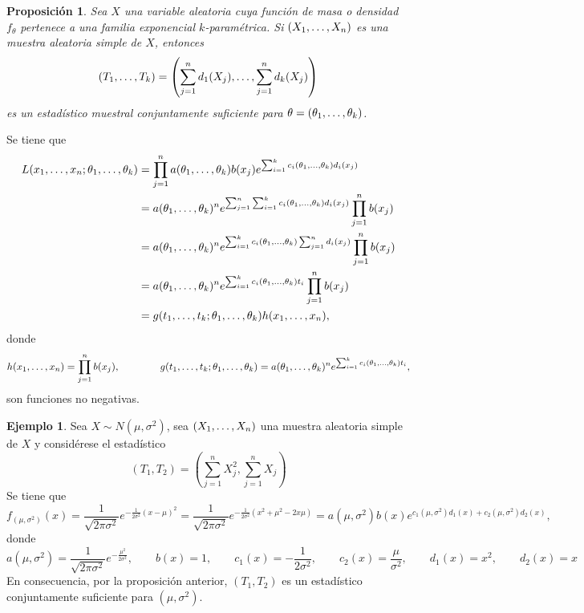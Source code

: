 \documentclass[11pt]{report}
\makeatletter
\renewenvironment{proof}[1][\proofname]{\par
  \pushQED{\qed}%
  \normalfont \topsep\z@skip %
  \trivlist
  \item[\hskip\labelsep
        \itshape
    #1\@addpunct{.}]\ignorespaces
}{%
  \popQED\endtrivlist\@endpefalse
}
\newtheorem{proposition}{Proposición}
\theoremstyle{definition}
\newtheorem{example}{Ejemplo}
\makeatother
\begin{document}
\begin{proposition}
Sea $X$ una variable aleatoria cuya función de masa o densidad $f_\theta$ pertenece a una familia exponencial $k$-paramétrica. Si $(X_1,\mathellipsis,X_n)$ es una muestra aleatoria simple de $X$, entonces
\[(T_1,\mathellipsis,T_k)=\left(\sum_{j=1}^n d_1(X_j),\mathellipsis,\sum_{j=1}^n d_k(X_j)\right)\]
es un estadístico muestral conjuntamente suficiente para $\theta = (\theta_1,\mathellipsis,\theta_k)$.
\end{proposition}

\begin{proof}
Se tiene que
\[
\begin{aligned}[t]
L(x_1,\mathellipsis,x_n;\theta_1,\mathellipsis,\theta_k)
&=\prod_{j=1}^na(\theta_1,\mathellipsis,\theta_k) b(x_j)e^{\sum_{i=1}^kc_i(\theta_1,\mathellipsis,\theta_k)d_i(x_j)} \\
&= a(\theta_1,\mathellipsis,\theta_k)^ne^{\sum_{j=1}^n\sum_{i=1}^kc_i(\theta_1,\mathellipsis,\theta_k)d_i(x_j)}\prod_{j=1}^nb(x_j) \\
&= a(\theta_1,\mathellipsis,\theta_k)^ne^{\sum_{i=1}^kc_i(\theta_1,\mathellipsis,\theta_k)\sum_{j=1}^nd_i(x_j)}\prod_{j=1}^nb(x_j) \\
&= a(\theta_1,\mathellipsis,\theta_k)^ne^{\sum_{i=1}^kc_i(\theta_1,\mathellipsis,\theta_k)t_i}\prod_{j=1}^nb(x_j) \\
&=g(t_1,\mathellipsis,t_k;\theta_1,\mathellipsis,\theta_k)h(x_1,\mathellipsis,x_n),
\end{aligned}
\]
donde \[h(x_1,\mathellipsis,x_n) = \prod_{j=1}^n b(x_j),\qquad\qquad g(t_1,\mathellipsis,t_k;\theta_1,\mathellipsis,\theta_k)= a(\theta_1,\mathellipsis,\theta_k)^ne^{\sum_{i=1}^kc_i(\theta_1,\mathellipsis,\theta_k)t_i},\]
son funciones no negativas.
\end{proof}

\begin{example}
Sea $X \sim N(\mu,\sigma^2)$, sea $(X_1,\mathellipsis,X_n)$ una muestra aleatoria simple de $X$ y considérese el estadístico
\[(T_1,T_2)=\left(\sum_{j=1}^nX_j^2,\sum_{j=1}^n X_j\right)\]
Se tiene que
\[f_{(\mu,\sigma^2)}(x) = \frac{1}{\sqrt{2\pi\sigma^2}}e^{-\frac{1}{2\sigma^2}(x-\mu)^2} = \frac{1}{\sqrt{2\pi\sigma^2}}e^{-\frac{1}{2\sigma^2}(x^2+\mu^2-2x\mu)} = a(\mu,\sigma^2)b(x)e^{c_1(\mu,\sigma^2)d_1(x)+c_2(\mu,\sigma^2)d_2(x)},\]
donde
\[a(\mu,\sigma^2) =\frac{1}{\sqrt{2\pi\sigma^2}}e^{-\frac{\mu^2}{2\sigma^2}}, \qquad b(x) = 1, \qquad c_1(x)=-\frac{1}{2\sigma^2}, \qquad c_2(x)=\frac{\mu}{\sigma^2}, \qquad d_1(x)=x^2, \qquad d_2(x) =x \]
En consecuencia, por la proposición anterior, $(T_1,T_2)$ es un estadístico conjuntamente suficiente para $(\mu,\sigma^2)$.
\end{example}
\end{document}

